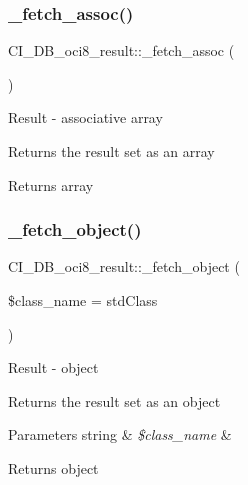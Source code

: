 \subsubsection{\texorpdfstring{\+\_\+fetch\+\_\+assoc()}{\_fetch\_assoc()}}
{\footnotesize\ttfamily C\+I\+\_\+\+D\+B\+\_\+oci8\+\_\+result\+::\+\_\+fetch\+\_\+assoc (\begin{DoxyParamCaption}{ }\end{DoxyParamCaption})\hspace{0.3cm}{\ttfamily [protected]}}

Result -\/ associative array

Returns the result set as an array

\begin{DoxyReturn}{Returns}
array 
\end{DoxyReturn}
\mbox{\label{class_c_i___d_b__oci8__result_ade59d712eb60e96b67dfe597763d46bc}} 
\subsubsection{\texorpdfstring{\+\_\+fetch\+\_\+object()}{\_fetch\_object()}}
{\footnotesize\ttfamily C\+I\+\_\+\+D\+B\+\_\+oci8\+\_\+result\+::\+\_\+fetch\+\_\+object (\begin{DoxyParamCaption}\item[{}]{\$class\+\_\+name = {\ttfamily \textquotesingle{}stdClass\textquotesingle{}} }\end{DoxyParamCaption})\hspace{0.3cm}{\ttfamily [protected]}}

Result -\/ object

Returns the result set as an object


\begin{DoxyParams}[1]{Parameters}
string & {\em \$class\+\_\+name} & \\
\hline
\end{DoxyParams}
\begin{DoxyReturn}{Returns}
object 
\end{DoxyReturn}
\mbox{\label{class_c_i___d_b__oci8__result_a28b127f026a8f8ba8573d6432c8c41cb}} 
